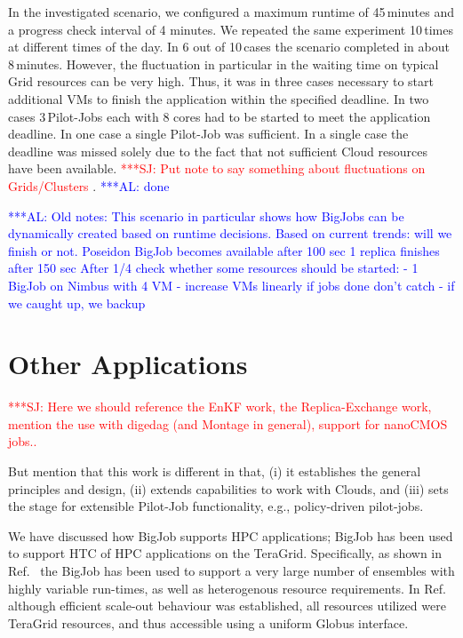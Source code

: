 \documentclass[conference,final]{IEEEtran}
\newcommand{\alnote}[1]{ {\textcolor{blue} { ***AL: #1 }}}
\newcommand{\jhanote}[1]{ {\textcolor{red} { ***SJ: #1 }}}
\newcommand{\alnote}[1]{}
\newcommand{\jhanote}[1]{}
\begin{document}
In the investigated scenario, we configured a maximum runtime of
45\,minutes and a progress check interval of 4 minutes. We repeated
the same experiment 10\,times at different times of the day. In 6 out
of 10\,cases the scenario completed in about 8\,minutes. However, the
fluctuation in particular in the waiting time on typical Grid
resources can be very high. Thus, it was in three cases necessary to
start additional VMs to finish the application within the specified
deadline. In two cases 3\,Pilot-Jobs each with 8 cores had to be
started to meet the application deadline. In one case a single
Pilot-Job was sufficient. In a single case the deadline was missed
solely due to the fact that not sufficient Cloud resources have been
available. \jhanote{Put note to say something about fluctuations on
  Grids/Clusters}. \alnote{done}

\alnote{Old notes: This scenario in particular shows how BigJobs can
  be dynamically created based on runtime decisions.  Based on current
  trends: will we finish or not.  Poseidon BigJob becomes available
  after 100 sec 1 replica finishes after 150 sec After 1/4 check
  whether some resources should be started: - 1 BigJob on Nimbus with
  4 VM - increase VMs linearly if jobs done don't catch - if we caught
  up, we backup}

\section{Other Applications}

\jhanote{Here we should reference the EnKF work, the Replica-Exchange
  work, mention the use with digedag (and Montage in general), support
  for nanoCMOS jobs..}

But mention that this work is different in that, (i) it establishes
the general principles and design, (ii) extends capabilities to work
with Clouds, and (iii) sets the stage for extensible Pilot-Job
functionality, e.g., policy-driven pilot-jobs.

We have discussed how BigJob supports HPC applications; BigJob has
been used to support HTC of HPC applications on the
TeraGrid. Specifically, as shown in Ref.~\cite{enkf-gmac09} the BigJob
has been used to support a very large number of ensembles with highly
variable run-times, as well as heterogenous resource requirements.  In
Ref.~\cite{enkf-gmac09} although efficient scale-out behaviour was
established, all resources utilized were TeraGrid resources, and thus
accessible using a uniform Globus interface. 
\end{document}
